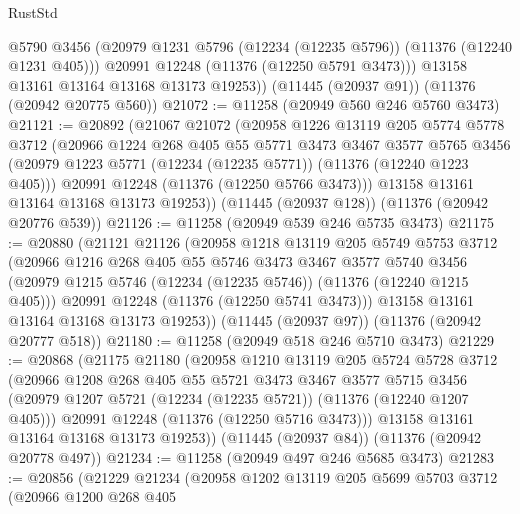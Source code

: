\begin{lexlean}{RustStd}
\begin{coremodule}
{\begin{coremodule}
{{{{{{{{{{{{{{{{{{{{{{{{{{{{{{{{{{{{{{{{{{{{{{{{{{{{{{{{{{{{{{{{{{{{{{{{{{{{{{{{{{{{{          @5790
          @3456
          (@20979 @1231 @5796 (@12234 (@12235 @5796)) (@11376 (@12240 @1231 @405)))
          @20991
          @12248
          (@11376 (@12250 @5791 @3473)))
        @13158
        @13161
        @13164
        @13168
        @13173
        @19253))
    (@11445 (@20937 @91))
    (@11376 (@20942 @20775 @560))
@21072 := @11258 (@20949 @560 @246 @5760 @3473)
@21121 := @20892
    (@21067
      @21072
      (@20958
        @1226
        @13119
        @205
        @5774
        @5778
        @3712
        (@20966
          @1224
          @268
          @405
          @55
          @5771
          @3473
          @3467
          @3577
          @5765
          @3456
          (@20979 @1223 @5771 (@12234 (@12235 @5771)) (@11376 (@12240 @1223 @405)))
          @20991
          @12248
          (@11376 (@12250 @5766 @3473)))
        @13158
        @13161
        @13164
        @13168
        @13173
        @19253))
    (@11445 (@20937 @128))
    (@11376 (@20942 @20776 @539))
@21126 := @11258 (@20949 @539 @246 @5735 @3473)
@21175 := @20880
    (@21121
      @21126
      (@20958
        @1218
        @13119
        @205
        @5749
        @5753
        @3712
        (@20966
          @1216
          @268
          @405
          @55
          @5746
          @3473
          @3467
          @3577
          @5740
          @3456
          (@20979 @1215 @5746 (@12234 (@12235 @5746)) (@11376 (@12240 @1215 @405)))
          @20991
          @12248
          (@11376 (@12250 @5741 @3473)))
        @13158
        @13161
        @13164
        @13168
        @13173
        @19253))
    (@11445 (@20937 @97))
    (@11376 (@20942 @20777 @518))
@21180 := @11258 (@20949 @518 @246 @5710 @3473)
@21229 := @20868
    (@21175
      @21180
      (@20958
        @1210
        @13119
        @205
        @5724
        @5728
        @3712
        (@20966
          @1208
          @268
          @405
          @55
          @5721
          @3473
          @3467
          @3577
          @5715
          @3456
          (@20979 @1207 @5721 (@12234 (@12235 @5721)) (@11376 (@12240 @1207 @405)))
          @20991
          @12248
          (@11376 (@12250 @5716 @3473)))
        @13158
        @13161
        @13164
        @13168
        @13173
        @19253))
    (@11445 (@20937 @84))
    (@11376 (@20942 @20778 @497))
@21234 := @11258 (@20949 @497 @246 @5685 @3473)
@21283 := @20856
    (@21229
      @21234
      (@20958
        @1202
        @13119
        @205
        @5699
        @5703
        @3712
        (@20966
          @1200
          @268
          @405
}}}}}}}}}}}}}}}}}}}}}}}}}}}}}}}}}}}}}}}}}}}}}}}}}}}}}}}}}}}}}}}}}}}}}}}}}}}}}}}}}}}}}
\end{coremodule}}
\end{coremodule}
\end{lexlean}
